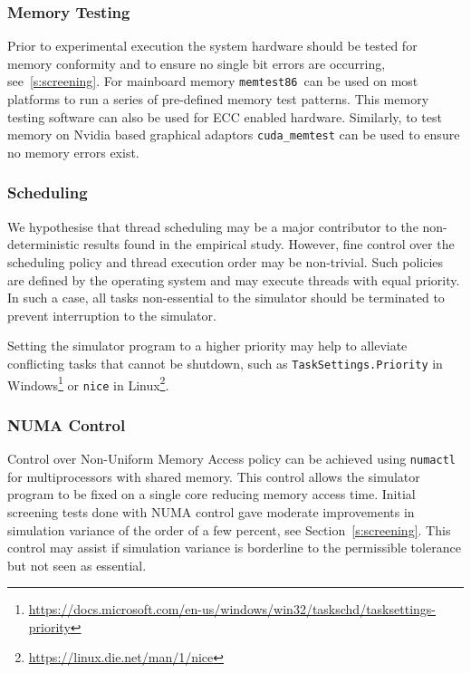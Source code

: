 \documentclass[letterpaper, 10 pt, journal, twoside]{IEEEtran}
\begin{document}

\subsubsection{Memory Testing}
Prior to experimental execution the system hardware should be tested for memory conformity and to ensure no single bit errors are occurring, see~\ref{s:screening}. For mainboard memory \texttt{memtest86}\ can be used on most platforms to run a series of pre-defined memory test patterns. This memory testing software can also be used for ECC enabled hardware. Similarly, to test memory on Nvidia based graphical adaptors \texttt{cuda\_memtest} can be used to ensure no memory errors exist.


\subsubsection{Scheduling}
We hypothesise that thread scheduling may be a major contributor to the non-deterministic results found in the empirical study. However, fine control over the scheduling policy and thread execution order may be non-trivial. Such policies are defined by the operating system and may execute threads with equal priority. In such a case, all tasks non-essential to the simulator should be terminated to prevent interruption to the simulator. 

Setting the simulator program to a higher priority may help to alleviate conflicting tasks that cannot be shutdown, such as \texttt{TaskSettings.Priority} in Windows\footnote{\url{https://docs.microsoft.com/en-us/windows/win32/taskschd/tasksettings-priority}} or \texttt{nice} in Linux\footnote{\url{https://linux.die.net/man/1/nice}}.

\subsubsection{NUMA Control}
Control over Non-Uniform Memory Access policy can be achieved using \texttt{numactl} for multiprocessors with shared memory. This control allows the simulator program to be fixed on a single core reducing memory access time.
%
Initial screening tests done with NUMA control gave moderate improvements in simulation variance of the order of a few percent, see Section~\ref{s:screening}. This control may assist if simulation variance is borderline to the permissible tolerance but not seen as essential.
\end{document}
